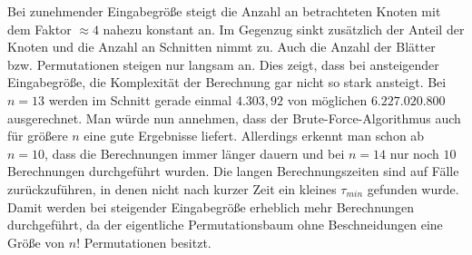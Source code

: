 \documentclass[german,version-2019-11]{uzl-thesis}
\begin{document}
\begin{table}[htpb]
\centering
{}
\caption{Beschneidungen im Permutationsbaum des Brute-Force-Algorithmus bei einer Eingabe von $1\leq n\leq 14$ Zielen}
\label{tab:ExpBF}
\end{table}
 
Bei zunehmender Eingabegröße steigt die Anzahl an betrachteten Knoten mit dem Faktor $\approx 4$ nahezu konstant an. Im Gegenzug sinkt zusätzlich der Anteil der Knoten und die Anzahl an Schnitten nimmt zu. Auch die Anzahl der Blätter bzw. Permutationen steigen nur langsam an. Dies zeigt, dass bei ansteigender Eingabegröße, die Komplexität der Berechnung gar nicht so stark ansteigt. Bei $n=13$ werden im Schnitt gerade einmal $4.303,92$ von möglichen $6.227.020.800$ ausgerechnet. Man würde nun annehmen, dass der Brute-Force-Algorithmus auch für größere $n$ eine gute Ergebnisse liefert. Allerdings erkennt man schon ab $n=10$, dass die Berechnungen immer länger dauern und bei $n=14$ nur noch $10$ Berechnungen durchgeführt wurden. Die langen Berechnungszeiten sind auf Fälle zurückzuführen, in denen nicht nach kurzer Zeit ein kleines $\tau_{min}$ gefunden wurde. Damit werden bei steigender Eingabegröße erheblich mehr Berechnungen durchgeführt, da der eigentliche Permutationsbaum ohne Beschneidungen eine Größe von $n!$ Permutationen besitzt.  
\end{document}
